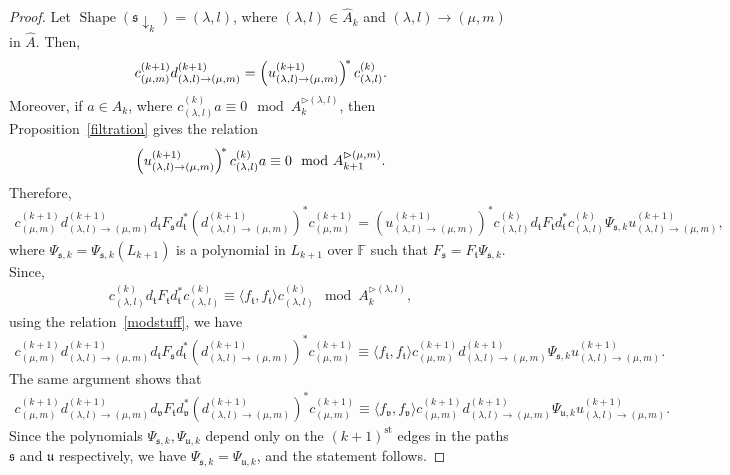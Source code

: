 \documentclass[11pt,a4paper,reqno,svgnames]{amsart}
\theoremstyle{plain}
\theoremstyle{definition}
\numberwithin{equation}{section}
\begin{document}
\begin{proof}
Let $\operatorname{Shape}(\mathfrak{s}\downarrow_k)=(\lambda,l)$, where $(\lambda,l)\in\hat{A}_k$ and $(\lambda,l)\to(\mu,m)$ in $\hat{A}$.
Then, 
\begin{align*}
c_{(\mu,m)}^{(k+1)}d_{(\lambda,l)\to(\mu,m)}^{(k+1)} =\left(u^{(k+1)}_{(\lambda,l)\to(\mu,m)}\right)^{\hspace{-1.5pt}*}c_{(\lambda,l)}^{(k)}. 
\end{align*}
Moreover, if  $a\in A_k$, where $c_{(\lambda,l)}^{(k)}a\equiv 0\mod A_{k}^{\rhd(\lambda,l)}$, then Proposition~\ref{filtration} gives the relation 
\begin{align}\label{modstuff}
\left(u^{(k+1)}_{(\lambda,l)\to(\mu,m)}\right)^{\hspace{-1.5pt}*}c_{(\lambda,l)}^{(k)}a \equiv0\mod A_{k+1}^{\rhd(\mu,m)}. 
\end{align}
Therefore,
\begin{align*}
c_{(\mu,m)}^{(k+1)}d_{(\lambda,l)\to(\mu,m)}^{(k+1)} d_\mathfrak{t} F_\mathfrak{s} d_\mathfrak{t}^* (d_{(\lambda,l)\to(\mu,m)}^{(k+1)})^*c_{(\mu,m)}^{(k+1)} = 
(u_{(\lambda,l)\to(\mu,m)}^{(k+1)} )^* c_{(\lambda,l)}^{(k)} d_\mathfrak{t} F_\mathfrak{t} d_\mathfrak{t}^* c_{(\lambda,l)}^{(k)} \Psi_{\mathfrak{s},k}u_{(\lambda,l)\to(\mu,m)}^{(k+1)},
\end{align*}
where $\Psi_{\mathfrak{s},k}=\Psi_{\mathfrak{s},k}(L_{k+1})$ is a polynomial in $L_{k+1}$ over $\mathbb{F}$ such that $F_\mathfrak{s}=F_\mathfrak{t}\Psi_{\mathfrak{s},k}$. Since,
\begin{align*}
c_{(\lambda,l)}^{(k)} d_\mathfrak{t} F_\mathfrak{t} d_\mathfrak{t}^* c_{(\lambda,l)}^{(k)}\equiv \langle f_\mathfrak{t},f_\mathfrak{t}\rangle c_{(\lambda,l)}^{(k)}  \mod A_{k}^{\rhd(\lambda,l)},
\end{align*}
using the relation~\eqref{modstuff}, we have 
\begin{align*}
c_{(\mu,m)}^{(k+1)}d_{(\lambda,l)\to(\mu,m)}^{(k+1)} d_\mathfrak{t} F_\mathfrak{s} d_\mathfrak{t}^* (d_{(\lambda,l)\to(\mu,m)}^{(k+1)})^*c_{(\mu,m)}^{(k+1)} \equiv \langle f_\mathfrak{t},f_\mathfrak{t}\rangle  c_{(\mu,m)}^{(k+1)}d_{(\lambda,l)\to(\mu,m)}^{(k+1)} \Psi_{\mathfrak{s},k} u_{(\lambda,l)\to(\mu,m)}^{(k+1)}. 
\end{align*}
The same argument shows that
\begin{align*}
c_{(\mu,m)}^{(k+1)}d_{(\lambda,l)\to(\mu,m)}^{(k+1)} d_\mathfrak{v} F_\mathfrak{t} d_\mathfrak{v}^* (d_{(\lambda,l)\to(\mu,m)}^{(k+1)})^*c_{(\mu,m)}^{(k+1)} \equiv \langle f_\mathfrak{v},f_\mathfrak{v}\rangle  c_{(\mu,m)}^{(k+1)}d_{(\lambda,l)\to(\mu,m)}^{(k+1)} \Psi_{\mathfrak{u},k} u_{(\lambda,l)\to(\mu,m)}^{(k+1)}. 
\end{align*}
Since the polynomials $\Psi_{\mathfrak{s},k},\Psi_{\mathfrak{u},k}$ depend only on the $(k+1)^{\text{st}}$ edges in the paths $\mathfrak{s}$ and $\mathfrak{u}$ respectively, we have $\Psi_{\mathfrak{s},k}=\Psi_{\mathfrak{u},k}$, and the statement follows.  
\end{proof}
\end{document}
